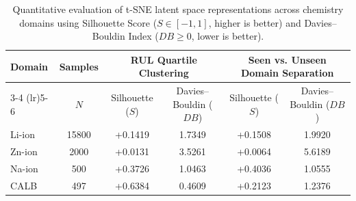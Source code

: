 \begin{table}[htbp]
\centering
\caption{Quantitative evaluation of t-SNE latent space representations across chemistry domains using Silhouette Score ($S \in [-1, 1]$, higher is better) and Davies--Bouldin Index ($DB \ge 0$, lower is better).}
\label{tab:tsne_quantitative_metrics}
\begin{tabular}{l c cc cc}
\toprule
Domain & Samples & \multicolumn{2}{c}{RUL Quartile Clustering} & \multicolumn{2}{c}{Seen vs. Unseen Domain Separation} \\
\cmidrule(lr){3-4} \cmidrule(lr){5-6}
 & $N$ & Silhouette ($S$) & Davies--Bouldin ($DB$) & Silhouette ($S$) & Davies--Bouldin ($DB$) \\
\midrule
Li-ion & 15800 & +0.1419 & 1.7349 & +0.1508 & 1.9920 \\
Zn-ion & 2000 & +0.0131 & 3.5261 & +0.0064 & 5.6189 \\
Na-ion & 500 & +0.3726 & 1.0463 & +0.4036 & 1.0555 \\
CALB & 497 & +0.6384 & 0.4609 & +0.2123 & 1.2376 \\
\bottomrule
\end{tabular}
\end{table}
